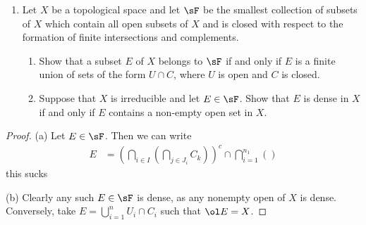 \documentclass[12pt]{amsart}
\begin{document}
% 
% 

\begin{enumerate}
  \item[7.20] {
      Let $X$ be a topological space and let $\sF$ be the smallest collection of subsets of $X$ which contain all open subsets of $X$ and is closed with respect to the formation of finite intersections and complements.
      \begin{enumerate}
        \item Show that a subset $E$ of $X$ belongs to $\sF$ if and only if $E$ is a finite union of sets of the form $U\cap C$, where $U$ is open and $C$ is closed.
        \item Suppose that $X$ is irreducible and let $E\in \sF$.
          Show that $E$ is dense in $X$ if and only if $E$ contains a non-empty open set in $X$.
      \end{enumerate}
    }
\end{enumerate}

\begin{proof}
  (a) Let $E\in \sF$.
  Then we can write
  \begin{align*}
    E
      &=\left(\bigcap_{i\in I} \left(\bigcap_{j\in J_i}C_k\right)\right)^c
      \cap\bigcap_{i=1}^{n_1}\left(\right)
  \end{align*}
  this sucks

  (b) Clearly any such $E\in \sF$ is dense, as any nonempty open of $X$ is dense.
  Conversely, take $E=\bigcup_{i=1}^n U_i\cap C_i$ such that $\ol E=X$.
\end{proof}
\end{document}
